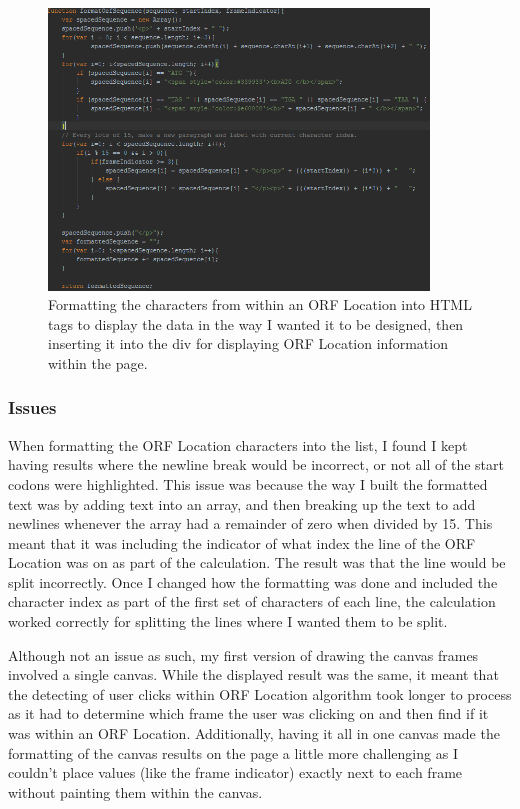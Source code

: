 \begin{figure}[H]
\centering
\includegraphics[width=0.9\textwidth]{images/orfdisplay3}
\caption{Formatting the characters from within an ORF Location into HTML tags to display the data in the way I wanted it to be designed, then inserting it into the div for displaying ORF Location information within the page.}
\end{figure}

\subsubsection{Issues}
When formatting the ORF Location characters into the list, I found I kept having results where the newline break would be incorrect, or not all of the start codons were highlighted. This issue was because the way I built the formatted text was by adding text into an array, and then breaking up the text to add newlines whenever the array had a remainder of zero when divided by 15. This meant that it was including the indicator of what index the line of the ORF Location was on as part of the calculation. The result was that the line would be split incorrectly. Once I changed how the formatting was done and included the character index as part of the first set of characters of each line, the calculation worked correctly for splitting the lines where I wanted them to be split.

Although not an issue as such, my first version of drawing the canvas frames involved a single canvas. While the displayed result was the same, it meant that the detecting of user clicks within ORF Location algorithm took longer to process as it had to determine which frame the user was clicking on and then find if it was within an ORF Location. Additionally, having it all in one canvas made the formatting of the canvas results on the page a little more challenging as I couldn't place values (like the frame indicator) exactly next to each frame without painting them within the canvas.


